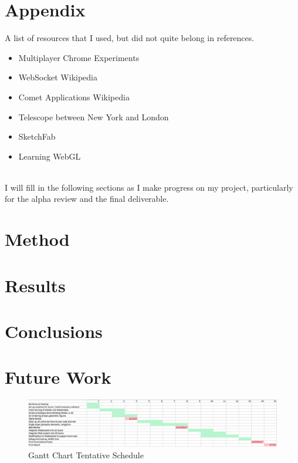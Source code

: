 \documentclass{acmsiggraph}
\begin{document}

\section{Appendix}
A list of resources that I used, but did not quite belong in references.
\begin{itemize}
    \item{Multiplayer Chrome Experiments}
    \item{WebSocket Wikipedia}
    \item{Comet Applications Wikipedia}
    \item{Telescope between New York and London}
    \item{SketchFab}
    \item{Learning WebGL}
\end{itemize}

\hrulefill \\
I will fill in the following sections as I make progress on my project, particularly for the alpha review and the final deliverable. %

\section{Method}
\section{Results}
\section{Conclusions}
\section{Future Work}



\nocite{*}
\begin{figure}[ht!]
\centering
\includegraphics[width=7.5in]{chen_gianni_gantt.eps}
\caption{Gantt Chart Tentative Schedule}
\end{figure}
\end{document}
